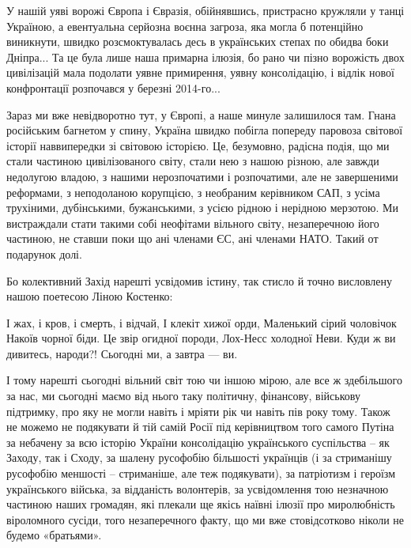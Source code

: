 У нашій уяві ворожі Європа і Євразія, обійнявшись, пристрасно кружляли у танці
Україною, а евентуальна серйозна воєнна загроза, яка могла б потенційно
виникнути, швидко розсмоктувалась десь в українських степах по обидва боки
Дніпра... Та це була лише наша примарна ілюзія, бо рано чи пізно ворожість двох
цивілізацій мала подолати уявне примирення, уявну консолідацію, і відлік нової
конфронтації розпочався у березні 2014-го...  

Зараз ми вже невідворотно тут, у Європі, а наше минуле залишилося там. Гнана
російським багнетом у спину, Україна швидко побігла попереду паровоза світової
історії наввипередки зі світовою історією. Це, безумовно, радісна подія, що ми
стали частиною цивілізованого світу, стали нею з нашою різною, але завжди
недолугою владою, з нашими нерозпочатими і розпочатими, але не завершеними
реформами, з неподоланою корупцією, з необраним керівником САП, з усіма
трухіними, дубінськими, бужанськими, з усією рідною і нерідною мерзотою. Ми
вистраждали стати такими собі неофітами вільного світу, незаперечною його
частиною, не ставши поки що ані членами ЄС, ані членами НАТО. Такий от
подарунок долі.

Бо колективний Захід нарешті усвідомив істину, так стисло й точно висловлену
нашою поетесою Ліною Костенко:

\begin{zznagolos}
\obeycr
І жах, і кров, і смерть, і відчай,
І клекіт хижої орди,
Маленький сірий чоловічок
Накоїв чорної біди.
Це звір огидної породи,
Лох-Несс холодної Неви.
Куди ж ви дивитесь, народи?!
Сьогодні ми, а завтра — ви.	
\restorecr
\end{zznagolos}

І тому нарешті сьогодні вільний світ тою чи іншою мірою, але все ж здебільшого
за нас, ми сьогодні маємо від нього таку політичну, фінансову, військову
підтримку, про яку не могли навіть і мріяти рік чи навіть пів року тому. Також
не можемо не подякувати й тій самій Росії під керівництвом того самого Путіна
за небачену за всю історію України консолідацію українського суспільства – як
Заходу, так і Сходу, за шалену русофобію більшості українців (і за стриманішу
русофобію меншості – стриманіше, але теж подякувати), за патріотизм і героїзм
українського війська, за відданість волонтерів, за усвідомлення тою незначною
частиною наших громадян, які плекали ще якісь наївні ілюзії про миролюбність
віроломного сусіди, того незаперечного факту, що ми вже стовідсотково ніколи не
будемо «братьями».

